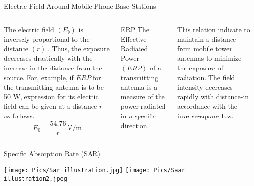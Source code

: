 \documentclass[7pt, aspectratio=169]{beamer}
\begin{document}
\begin{frame}{Electric Field Around Mobile Phone Base Stations}
\begin{columns}
    The electric field \((E_0)\) is inversely proportional to the distance \((r)\) . Thus, the exposure decreases drastically with the increase in the distance from the source. For, example, if \(ERP\) for the transmitting antenna is to be 50 W, expression for its electric field can be given at a distance \(r\) as follows:
    \[
        E_0 = \frac{54.76}{r} \, \text{V/m}
    \]
    
    \begin{block}{ERP}
    The Effective Radiated Power \((ERP)\) of a transmitting antenna is a measure of the power radiated in a specific direction.
    \end{block}
    This relation indicate to maintain a distance from mobile tower antennas to minimize the exposure of radiation. The field intensity decreases rapidly with distance-in accordance with the inverse-square law.

    
\end{columns}
    
\end{frame}

\begin{frame}{Specific Absorption Rate (SAR)}
\begin{center}
    \texttt{[image: Pics/Sar illustration.jpg]}
    \texttt{[image: Pics/Saar illustration2.jpeg]}
\end{center}
    
\end{frame}
\end{document}
